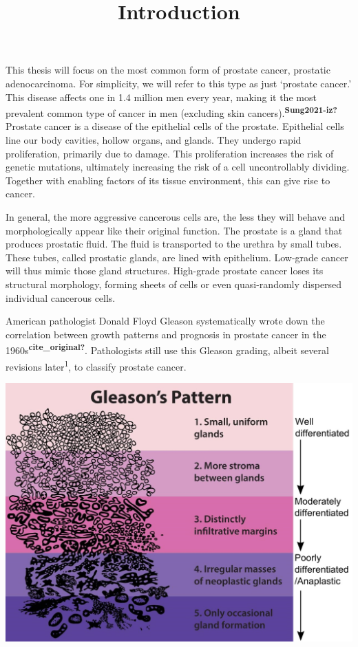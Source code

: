 \documentclass[
  12pt,
  a5,margin=2cmpaper,
]{article}
\title{Introduction}
\author{}
\date{}
\begin{document}
\maketitle

This thesis will focus on the most common form of prostate cancer,
prostatic adenocarcinoma. For simplicity, we will refer to this type as
just `prostate cancer.' This disease affects one in 1.4 million men
every year, making it the most prevalent common type of cancer in men
(excluding skin cancers).\textsuperscript{\textbf{Sung2021-iz?}}
Prostate cancer is a disease of the epithelial cells of the prostate.
Epithelial cells line our body cavities, hollow organs, and glands. They
undergo rapid proliferation, primarily due to damage. This proliferation
increases the risk of genetic mutations, ultimately increasing the risk
of a cell uncontrollably dividing. Together with enabling factors of its
tissue environment, this can give rise to cancer.

In general, the more aggressive cancerous cells are, the less they will
behave and morphologically appear like their original function. The
prostate is a gland that produces prostatic fluid. The fluid is
transported to the urethra by small tubes. These tubes, called prostatic
glands, are lined with epithelium. Low-grade cancer will thus mimic
those gland structures. High-grade prostate cancer loses its structural
morphology, forming sheets of cells or even quasi-randomly dispersed
individual cancerous cells.

American pathologist Donald Floyd Gleason systematically wrote down the
correlation between growth patterns and prognosis in prostate cancer in
the 1960s\textsuperscript{\textbf{cite\_original?}}. Pathologists still
use this Gleason grading, albeit several revisions
later\textsuperscript{1}, to classify prostate cancer.

\includegraphics{chpt1_imgs/Gleasonscore.jpg}
\end{document}
